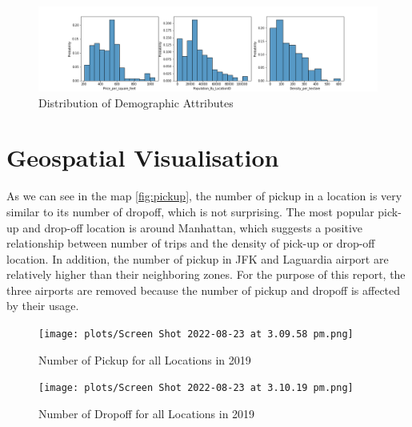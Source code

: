\documentclass[11pt]{article}
\begin{document}
\begin{figure}[h]
    \includegraphics[width=1.15\textwidth]{plots/distribution_of_demo.png}
    \caption{Distribution of Demographic Attributes}
    \label{fig:distributionofdemo}
\end{figure}
\section{Geospatial Visualisation}
As we can see in the map \ref{fig:pickup}, the number of pickup in a location is very similar to its number of dropoff, which is not surprising. The most popular pick-up and drop-off location is around Manhattan, which suggests a positive relationship between number of trips and the density of pick-up or drop-off location. In addition, the number of pickup in JFK and Laguardia airport are relatively higher than their neighboring zones. For the purpose of this report, the three airports are removed because the number of pickup and dropoff is affected by their usage. 
\begin{figure}[h]
    \centering
    \begin{minipage}{0.45\textwidth}
        \centering
        \texttt{[image: plots/Screen Shot 2022-08-23 at 3.09.58 pm.png]}
        \caption{Number of Pickup for all Locations in 2019}
        \label{fig:pickup}
    \end{minipage}\hfill
    \begin{minipage}{0.45\textwidth}
        \centering
        \texttt{[image: plots/Screen Shot 2022-08-23 at 3.10.19 pm.png]}
        \caption{Number of Dropoff for all Locations in 2019}
        \label{fig:dropoff}
    \end{minipage}
\end{figure}
\end{document}
